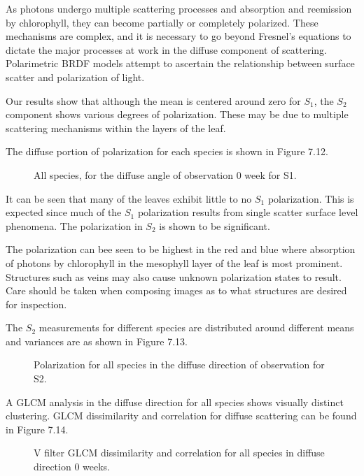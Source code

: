 As photons undergo multiple scattering processes and absorption and reemission by chlorophyll, they can become partially or completely polarized.  These mechanisms are complex, and it is necessary to go beyond Fresnel’s equations to dictate the major processes at work in the diffuse component of scattering.  Polarimetric BRDF models attempt to ascertain the relationship between surface scatter and polarization of light.

Our results show that although the mean is centered around zero for $S_1$, the $S_2$ component shows various degrees of polarization.  These may be due to multiple scattering mechanisms within the layers of the leaf.

The diffuse portion of polarization for each species is shown in Figure 7.12.
%
\begin{sidewaysfigure}
    \begin{center}
    \end{center}
    \caption{All species, for the diffuse angle of observation 0 week for S1.}
    \label{fig:polarization}
\end{sidewaysfigure}
%
It can be seen that many of the leaves exhibit little to no $S_1$ polarization.  This is expected since much of the $S_1$ polarization results from single scatter surface level phenomena.  The polarization in $S_2$ is shown to be significant.

The polarization can bee seen to be highest in the red and blue where absorption of photons by chlorophyll in the mesophyll layer of the leaf is most prominent.  Structures such as veins may also cause unknown polarization states to result.  Care should be taken when composing images as to what structures are desired for inspection.

The $S_2$ measurements for different species are distributed around different means and variances are as shown in Figure 7.13.
%
\begin{sidewaysfigure}
    \begin{center}
    \end{center}
    \caption{Polarization for all species in the diffuse direction of observation for S2.}
    \label{fig:polarization}
\end{sidewaysfigure}
%
A GLCM analysis in the diffuse direction for all species shows visually distinct clustering.  GLCM dissimilarity and correlation for diffuse scattering can be found in Figure 7.14.
%
\begin{sidewaysfigure}
    \begin{center}
    \end{center}
    \caption{V filter GLCM dissimilarity and correlation for all species in diffuse direction 0 weeks.}
    \label{fig:polarization}
\end{sidewaysfigure}
%
